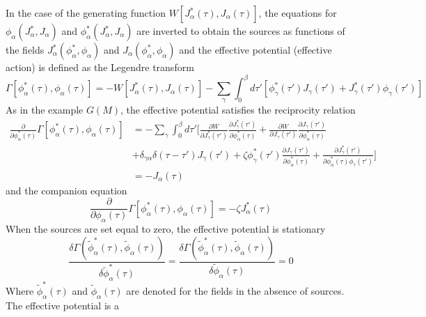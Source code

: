 \documentclass[12pt]{article}
\begin{document}
In the case of the generating function $W[J^*_\alpha(\tau),J_\alpha(\tau)]$, 
the equations for $\phi_\alpha(J^*_\alpha,J_\alpha)$ and $\phi_\alpha^*
(J^*_\alpha,J_\alpha)$ are inverted to obtain the sources as functions of the 
fields $J^*_\alpha(\phi^*_\alpha,\phi_\alpha)$ and $J_\alpha(\phi^*_\alpha,
\phi_\alpha)$ and the effective potential (effective action) is defined as the 
Legendre transform
\begin{equation*}
    \Gamma[\phi^*_\alpha(\tau),\phi_\alpha(\tau)]=-W[J^*_\alpha(\tau),
    J_\alpha(\tau)]-\sum_\gamma\int_0^\beta d\tau'[\phi^*_\gamma(\tau')J_\gamma
    (\tau')+J^*_\gamma(\tau')\phi_\gamma(\tau')]
\end{equation*}
As in the example $G(M)$, the effective potential satisfies the reciprocity 
relation
\begin{equation*}
    \begin{split}
        \frac{\partial}{\partial\phi^*_\alpha(\tau)}\Gamma[\phi^*_\alpha(\tau),
        \phi_\alpha(\tau)]&=-\sum_\gamma\int_0^\beta d\tau'\bigg[\frac{\partial
        W}{\partial J^*_\gamma(\tau')}\frac{\partial J^*_\gamma(\tau')}
        {\partial\phi^*_\alpha(\tau)}+\frac{\partial W}{\partial J_\gamma(\tau')}
        \frac{\partial J_\gamma(\tau')}{\partial\phi^*_\alpha(\tau)}\\
        &+\delta_{\gamma\alpha}\delta(\tau-\tau')J_\gamma(\tau')+\zeta
        \phi_\gamma^*(\tau')\frac{\partial J_\gamma(\tau')}{\partial\phi^*
        _\alpha(\tau)}+\frac{\partial J_\gamma^*(\tau')}{\partial\phi^*_\alpha
        (\tau)\phi_\gamma(\tau')}\bigg]\\
        &=-J_\alpha(\tau)
    \end{split}
\end{equation*}
and the companion equation
\begin{equation*}
    \frac{\partial}{\partial\phi_\alpha(\tau)}\Gamma[\phi^*_\alpha(\tau),
    \phi_\alpha(\tau)]=-\zeta J^*_\alpha(\tau)
\end{equation*}
When the sources are set equal to zero, the effective potential is stationary
\begin{equation*}
    \frac{\delta\Gamma(\tilde{\phi}^*_\alpha(\tau),\tilde{\phi}_\alpha(\tau))}
    {\delta\tilde{\phi}^*_\alpha(\tau)}=
    \frac{\delta\Gamma(\tilde{\phi}^*_\alpha(\tau),\tilde{\phi}_\alpha(\tau))}
    {\delta\tilde{\phi}_\alpha(\tau)}=0
\end{equation*}
Where $\tilde{\phi}^*_\alpha(\tau)$ and $\tilde{\phi}_\alpha(\tau)$ are denoted 
for the fields in the absence of sources. The effective potential is a 
\end{document}
